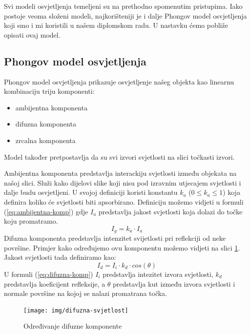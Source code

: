 \documentclass[times, utf8, diplomskirad]{fer}
\begin{document}
Svi modeli osvjetljenja temeljeni su na prethodno spomenutim pristupima.
Iako postoje veoma složeni modeli, najkorišteniji je i dalje Phongov model osvjetljenja koji smo i mi koristili u našem diplomskom radu.
U nastavku ćemo pobliže opisati ovaj model.

\subsection{Phongov model osvjetljenja}
\label{pog:phong}
Phongov model osvjetljenja prikazuje osvjetljenje našeg objekta kao linearnu kombinaciju triju komponenti:
\begin{itemize}
    \item ambijentna komponenta
    \item difuzna komponenta
    \item zrcalna komponenta
\end{itemize}
Model također pretpostavlja da su svi izvori svjetlosti na slici točkasti izvori.

Ambijentna komponenta predstavlja interackiju svjetlosti između objekata na našoj slici.
Služi kako dijelovi slike koji nisu pod izravnim utjecajem svjetlosti i dalje budu osvjetljeni.
U svojoj definiciji koristi konstantu $k_a$ ($0 \leq k_a \leq 1$) koja definira koliko će svjetlosti biti apsorbirano.
Definiciju možemo vidjeti u formuli (\ref{eq:ambijentna-komp}) gdje $I_a$ predstavlja jakost svjetlosti koja dolazi do točke koju promatramo.
\begin{equation}
    I_g = k_a \cdot I_a
    \label{eq:ambijentna-komp}
\end{equation}
Difuzna komponenta predstavlja intenzitet svijetlosti pri reflekciji od neke površine.
Primjer kako određujemo ovu komponentu možemo vidjeti na slici \ref{fig:difuzna-svjetlost}.
Jakost svjetlosti tada definiramo kao:
\begin{equation}
    I_d = I_i \cdot k_d \cdot cos(\theta)
    \label{eq:difuzna-komp}
\end{equation}
U formuli (\ref{eq:difuzna-komp}) $I_i$ predstavlja intezitet izvora svjetlosti, $k_d$ predstavlja koeficijent refleksije, a $\theta$ predstavlja kut između izvora svjetlosti i normale površine na kojoj se nalazi promatrana točka.

\begin{figure}[H]
    \centering
    \texttt{[image: img/difuzna-svjetlost]}
    \caption{Određivanje difuzne komponente}
    \label{fig:difuzna-svjetlost}
\end{figure}
\end{document}
